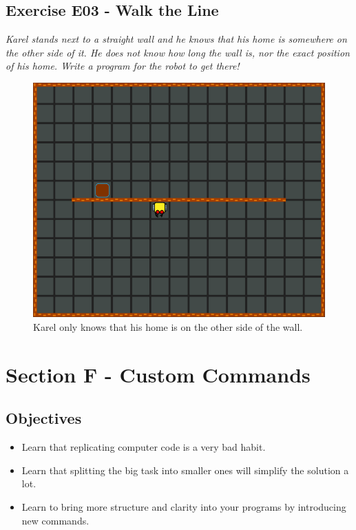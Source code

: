 {{{{\subsection{Exercise E03 - Walk the Line}

{\em Karel stands next to a straight wall and he knows that his home is somewhere on the other side of it. He does not know how long the wall is, nor the exact position of his home. Write a program for the robot to get there!}

\begin{figure}[!ht]
\begin{center}
\includegraphics[height=0.4\textwidth]{imgk/e03.png}
\end{center}
\vspace{-4mm}
\caption{Karel only knows that his home is on the other side of the wall.}
\label{fig:e03}
\end{figure}
\noindent


\section{Section F - Custom Commands} \label{sec:newcom}

\subsection{Objectives} 
 
\begin{itemize}
\item Learn that replicating computer code is a very bad habit.
\item Learn that splitting the big task into smaller ones will simplify the solution a lot. 
\item Learn to bring more structure and clarity into your programs by introducing new commands.
\end{itemize}

}}}}
